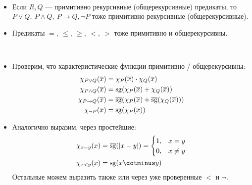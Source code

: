 \begin{st}
	~\begin{itemize}
		\item Если  $ R, Q$ --- примитивно рекурсивные (общерекурсивные) предикаты, то $ P \vee Q, ~ P \wedge Q, ~ P \to Q, \neg P$ тоже примитивно рекурсивные (общерекурсивные).
		\item Предикаты $ = , ~\le , ~\ge , ~<, ~>$ тоже примитивно и общерекурсивны.
    \end{itemize}
\end{st}
\begin{proof*}
	~\begin{itemize}
		\item Проверим, что характеристические функции примитивно / общерекурсивны: 
			\[
			\begin{aligned}
				\chi_{P\vee Q}(\overline{x}) & = \chi_{P}(\overline{x}) \cdot \chi_{Q}(\overline{x}) \\
				\chi_{P \wedge Q}(\overline{x}) & = \operatorname{sg}(\chi_{P}(\overline{x}) + \chi_{Q}(\overline{x})) \\
				\chi_{P \to Q}(\overline{x}) &= \operatorname{\overline{sg}}(\chi_{P}(\overline{x}) + \operatorname{\overline{sg}}(\chi_{Q}(\overline{x}))) \\
				\chi_{\neg P} (\overline{x}) & = \operatorname{\overline{sg}}(\chi_{P}(\overline{x}))
			\end{aligned}
			\]
		\item Аналогично выразим, через простейшие:  
			\[
			\begin{aligned}
				\chi_{x=y} (x) &= \bsg(\lvert x - y \rvert ) = \begin{cases}
					1, &x=y \\
					0, &x\ne y
				\end{cases} \\
					\chi_{x< y}(x) &= \sg(x \dotminus y)
			\end{aligned}
			\]
			Остальные можем выразить также или через уже проверенные $ <$ и $ \neg$.
    \end{itemize}
\end{proof*}


